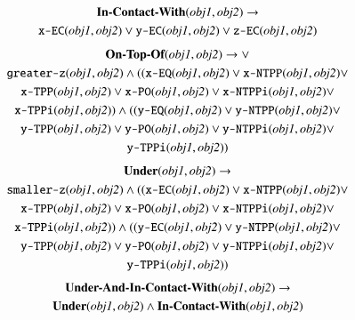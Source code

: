\documentclass[final,1p,times]{elsarticle}
\begin{document}
\begin{gather}
\label{eq:in-contact-with}
\textbf{In-Contact-With}(\textit{obj1}, \textit{obj2}) \rightarrow \\
\texttt{x-EC}(\textit{obj1}, \textit{obj2}) \vee \texttt{y-EC}(\textit{obj1}, \textit{obj2}) \vee \texttt{z-EC}(\textit{obj1}, \textit{obj2})\notag
\end{gather}
\begin{gather}
\label{eq:on-top-of}
\textbf{On-Top-Of}(\textit{obj1}, \textit{obj2}) \rightarrow \vee \\
\texttt{greater-z}(\textit{obj1}, \textit{obj2}) \wedge ((\texttt{x-EQ}(\textit{obj1}, \textit{obj2}) \vee \texttt{x-NTPP}(\textit{obj1}, \textit{obj2}) \vee \notag\\
\texttt{x-TPP}(\textit{obj1}, \textit{obj2}) \vee \texttt{x-PO}(\textit{obj1}, \textit{obj2}) \vee \texttt{x-NTPPi}(\textit{obj1}, \textit{obj2}) \vee \notag\\
\texttt{x-TPPi}(\textit{obj1}, \textit{obj2})) \wedge ((\texttt{y-EQ}(\textit{obj1}, \textit{obj2}) \vee \texttt{y-NTPP}(\textit{obj1}, \textit{obj2}) \vee \notag\\
\texttt{y-TPP}(\textit{obj1}, \textit{obj2}) \vee \texttt{y-PO}(\textit{obj1}, \textit{obj2}) \vee \texttt{y-NTPPi}(\textit{obj1}, \textit{obj2}) \vee \notag\\
\texttt{y-TPPi}(\textit{obj1}, \textit{obj2})) \notag
\end{gather}
\begin{gather}
\label{eq:under}
\textbf{Under}(\textit{obj1}, \textit{obj2}) \rightarrow \\
\texttt{smaller-z}(\textit{obj1}, \textit{obj2}) \wedge ((\texttt{x-EC}(\textit{obj1}, \textit{obj2}) \vee \texttt{x-NTPP}(\textit{obj1}, \textit{obj2}) \vee  \notag\\
\texttt{x-TPP}(\textit{obj1}, \textit{obj2}) \vee \texttt{x-PO}(\textit{obj1}, \textit{obj2}) \vee \texttt{x-NTPPi}(\textit{obj1}, \textit{obj2}) \vee  \notag\\
\texttt{x-TPPi}(\textit{obj1}, \textit{obj2})) \wedge ((\texttt{y-EC}(\textit{obj1}, \textit{obj2}) \vee \texttt{y-NTPP}(\textit{obj1}, \textit{obj2}) \vee  \notag\\
\texttt{y-TPP}(\textit{obj1}, \textit{obj2}) \vee \texttt{y-PO}(\textit{obj1}, \textit{obj2}) \vee \texttt{y-NTPPi}(\textit{obj1}, \textit{obj2}) \vee  \notag\\
\texttt{y-TPPi}(\textit{obj1}, \textit{obj2})) \notag
\end{gather}
\begin{gather}
\label{eq:Under-And-In-Contact-With}
\textbf{Under-And-In-Contact-With}(\textit{obj1}, \textit{obj2}) \rightarrow \\
\textbf{Under}(\textit{obj1}, \textit{obj2}) \wedge \textbf{In-Contact-With}(\textit{obj1}, \textit{obj2})\notag
\end{gather}
\end{document}
